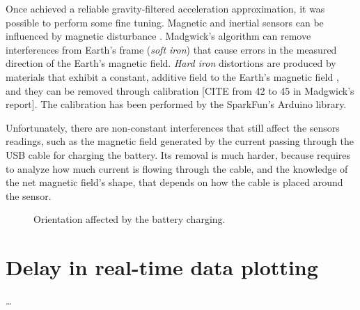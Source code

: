 Once achieved a reliable gravity-filtered acceleration approximation, it was possible to perform some fine tuning. Magnetic and inertial sensors can be influenced by magnetic disturbance \cite{Fan17}. Madgwick's algorithm can remove interferences from Earth's frame (\textit{soft iron}) \cite[11-12]{Mad10} that cause errors in the measured direction of the Earth's magnetic field. \textit{Hard iron} distortions are produced by materials that exhibit a constant, additive field to the Earth's magnetic field \cite{CompensatingIron}, and they can be removed through calibration \cite{CompensatingIron, Geb06, Kok12} [CITE from 42 to 45 in Madgwick's report]. The calibration has been performed by the SparkFun's Arduino library.

Unfortunately, there are non-constant interferences that still affect the sensors readings, such as the magnetic field generated by the current passing through the USB cable for charging the battery.
Its removal is much harder, because requires to analyze how much current is flowing through the cable, and the knowledge of the net magnetic field's shape, that depends on how the cable is placed around the sensor.
\bigbreak

\begin{center}
	\begin{figure}[ht!]
		\caption{Orientation affected by the battery charging.}
	\end{figure}
\end{center}

\section{Delay in real-time data plotting}
\dots
